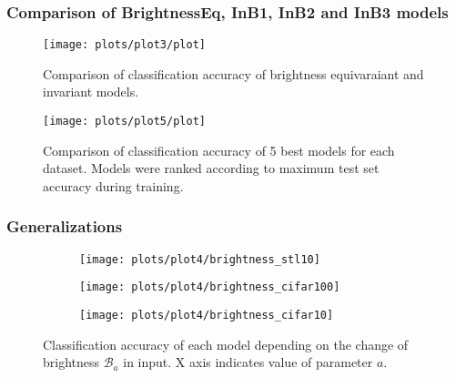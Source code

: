     \subsubsection*{Comparison of BrightnessEq, InB1, InB2 and InB3 models}
    \begin{figure}[h]
        \centering
        \texttt{[image: plots/plot3/plot]}
        \caption{Comparison of classification accuracy of
        brightness equivaraiant and invariant models.}
        \label{fig:plot3}
    \end{figure}

    \begin{figure}[h]
        \centering
        \texttt{[image: plots/plot5/plot]}
        \caption{Comparison of classification accuracy of
            5 best models for each dataset.
            Models were ranked according to maximum test set accuracy during
            training.}
        \label{fig:plot5}
    \end{figure}



    \subsubsection*{Generalizations}
    \begin{figure}[h]
    \begin{adjustwidth}{-11em}{-11em}
        \centering
        \begin{subfigure}{0.6\textwidth}
            \texttt{[image: plots/plot4/brightness\_stl10]}
        \end{subfigure}
        \begin{subfigure}{0.6\textwidth}
            \texttt{[image: plots/plot4/brightness\_cifar100]}
        \end{subfigure}
        \begin{subfigure}{0.6\textwidth}
            \texttt{[image: plots/plot4/brightness\_cifar10]}
        \end{subfigure}
    \end{adjustwidth}
        \caption{Classification accuracy of each model depending on the change
        of brightness $\mathcal{B}_a$ in input. X axis indicates value of
        parameter $a$.}
        \label{fig:plot4brightness}
    \end{figure}


